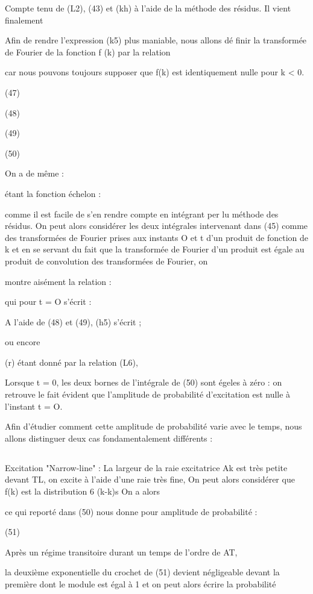  Compte tenu de (L2), (43) et (kh) à l'aide de la méthode
des résidus. Il vient finalement

Afin de rendre l'expression (k5) plus maniable, nous allons dé
finir la transformée de Fourier de la fonction f (k) par la relation

car nous pouvons toujours supposer que f(k) est identiquement nulle pour k < 0.

(47)

(48)

(49)

(50)

On a de même :

 étant la fonction échelon : 

comme il est facile de s'en rendre compte en intégrant per lu méthode des
résidus. On peut alors considérer les deux intégrales intervenant dans (45)
comme des transformées de Fourier prises aux instants O et t d'un produit de
fonction de k et en se servant du fait que la transformée de Fourier d'un
produit est égale au produit de convolution des transformées de Fourier, on

montre aisément la relation :

qui pour t = O s'écrit :

A l'aide de (48) et (49), (h5) s'écrit ;

ou encore

(r) étant donné par la relation (L6),


Lorsque t = 0, les deux bornes de l'intégrale de (50) sont
égeles à zéro : on retrouve le fait évident que l'amplitude de probabilité
d'excitation est nulle à l'instant t = O.

Afin d'étudier comment cette amplitude de probabilité varie
avec le temps, nous allons distinguer deux cas fondamentalement différents :
\subsection{} Excitation "Narrow-line" :%
La largeur de la raie excitatrice Ak est très
petite devant TL,  on excite à l'aide d'une raie très fine, On peut alors
considérer que f(k) est la distribution 6 (k-k)s On a alors

ce qui reporté dans (50) nous donne pour amplitude de probabilité :

(51)

Après un régime transitoire durant un temps de l'ordre de AT,

la deuxième exponentielle du crochet de (51) devient négligeable devant la
première dont le module est égal à 1 et on peut alors écrire la probabilité

